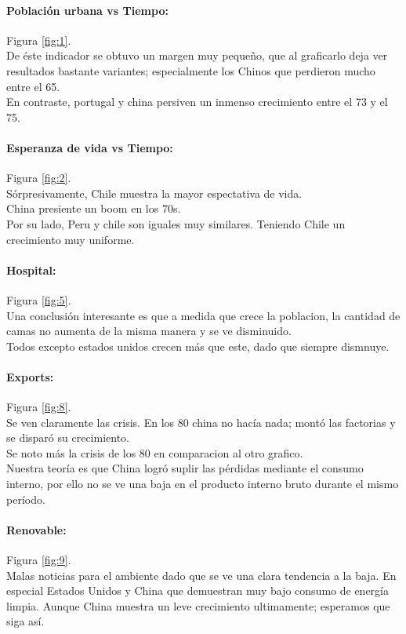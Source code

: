 \documentclass{article}
\begin{document}
\paragraph{Población urbana vs Tiempo:}
Figura \ref{fig:1}.\\
De éste indicador se obtuvo un margen muy pequeño, que al graficarlo deja ver resultados bastante variantes; especialmente los Chinos que perdieron mucho entre el 65.\\
En contraste, portugal y china persiven un inmenso crecimiento entre el 73 y el 75.\\


\paragraph{Esperanza de vida vs Tiempo:}
Figura \ref{fig:2}.\\
Sórpresivamente, Chile muestra la mayor espectativa de vida.\\
China presiente un boom en los 70s.\\
Por su lado, Peru y chile son iguales muy similares. Teniendo Chile un crecimiento muy uniforme.\\


\paragraph{Hospital:}
Figura \ref{fig:5}.\\
Una conclusión interesante es que a medida que crece la poblacion, la cantidad de camas no aumenta de la misma manera y se ve disminuido.\\
Todos excepto estados unidos crecen más que este, dado que siempre dismnuye.

\paragraph{Exports:}
Figura \ref{fig:8}.\\
Se ven claramente las crisis. En los 80 china no hacía nada; montó las factorias y se disparó su crecimiento.\\
Se noto más la crisis de los 80 en comparacion al otro grafico. \\

Nuestra teoría es que China logró suplir las pérdidas mediante el consumo interno, por ello no se ve una baja en el producto interno bruto durante el mismo período.

\paragraph{Renovable:}
Figura \ref{fig:9}.\\
Malas noticias para el ambiente dado que se ve una clara tendencia a la baja. En especial Estados Unidos y China que demuestran muy bajo consumo de energía limpia. Aunque China muestra un leve crecimiento ultimamente; esperamos que siga así.
\end{document}
